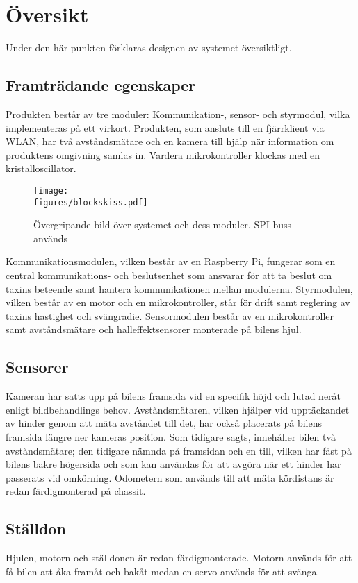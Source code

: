 \documentclass[tekniskrapport/tech.tex]{subfiles}
\begin{document}
\section{Översikt}
Under den här punkten förklaras designen av systemet översiktligt.

\subsection{Framträdande egenskaper}
Produkten består av tre moduler: Kommunikation-, sensor- och styrmodul, vilka
implementeras på ett virkort. Produkten, som ansluts till en fjärrklient via
WLAN, har två avståndsmätare och en kamera till hjälp när information om
produktens omgivning samlas in. Vardera mikrokontroller klockas med en
kristalloscillator.

\begin{figure}[h]
    \centering
    \texttt{[image: \\figures/blockskiss.pdf]}
    \caption{Övergripande bild över systemet och dess moduler. SPI-buss används}
    \label{fig:overview}
\end{figure}

\noindent
Kommunikationsmodulen, vilken består av en Raspberry Pi, fungerar som en
central kommun\-ikations- och beslutsenhet som ansvarar för att ta beslut om
taxins beteende samt hantera kommunikationen mellan modulerna. Styrmodulen,
vilken består av en motor och en mikrokontroller, står för drift samt reglering
av taxins hastighet och svängradie. Sensormodulen består av en mikrokontroller
samt avståndsmätare och halleffektsensorer monterade på bilens hjul.

\subsection{Sensorer}
Kameran har satts upp på bilens framsida vid en specifik höjd och lutad neråt
enligt bildbehandlings behov. Avståndsmätaren, vilken hjälper vid upptäckandet
av hinder genom att mäta avståndet till det, har också placerats på bilens
framsida längre ner kameras position.  Som tidigare sagts, innehåller bilen två
avståndsmätare; den tidigare nämnda på framsidan och en till, vilken har fäst
på bilens bakre högersida och som kan användas för att avgöra när ett hinder
har passerats vid omkörning. Odometern som används till att mäta kördistans är
redan färdigmonterad på chassit.

\subsection{Ställdon}
Hjulen, motorn och ställdonen är redan färdigmonterade. Motorn används
för att få bilen att åka framåt och bakåt medan en servo används för att svänga.
\end{document}
